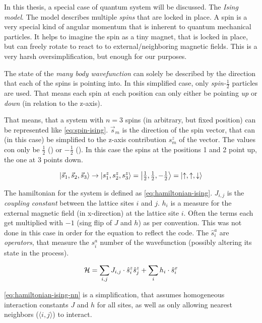 In this thesis, a special case of quantum system will be discussed. 
The \emph{Ising model}.
The model describes multiple \emph{spins} that are locked in place. 
A spin is a very special kind of angular momentum that is inherent to quantum mechanical particles.
It helps to imagine the spin as a tiny magnet, that is locked in place, but can freely rotate to react to to external/neighboring  magnetic fields. This is a very harsh oversimplification, but enough for our purposes.

The state of the \emph{many body wavefunction} can solely be described by the direction that each of the spins is pointing into. In this simplified case, only \emph{spin-$\frac{1}{2}$} particles are used. That means each spin at each position can only either be pointing \emph{up} \up or \emph{down} \down (in relation to the z-axis).

That means, that a system with $n=3$ spins (in arbitrary, but fixed position) can be represented like \ref{eq:spin-ising}. $\vec{s}_m$ is the direction of the spin vector, that can (in this case) be simplified to the z-axis contribution $s^z_m$ of the vector. The values con only be $\frac{1}{2}$ (\up) or $-\frac{1}{2}$ (\down).
In this case the spins at the positions 1 and 2 point up, the one at 3 points down.

\begin{equation}
    \label{eq:spin-ising}
    \ket{\vec{s}_1, \vec{s}_2, \vec{s}_3} \rightarrow \ket{s^z_{1}, s^z_{2}, s^z_{3}} = \ket{\tfrac{1}{2}, \tfrac{1}{2}, -\tfrac{1}{2}} = \ket{\uparrow, \uparrow, \downarrow}
\end{equation}

The hamiltonian for the system is defined as \ref{eq:hamiltonian-ising}. $J_{i, j}$ is the \emph{coupling constant} between the lattice sites $i$ and $j$. $h_i$ is a measure for the external magnetic field (in x-direction) at the lattice site $i$. Often the terms each get multiplied with $-1$ (sing flip of $J$ and $h$) as per convention. This was not done in this case in order for the equation to reflect the code. The $\hat{s}^a_i$ are \emph{operators}, that measure the $s^a_i$ number of the wavefunction (possibly altering its state in the process).

\begin{equation}
    \label{eq:hamiltonian-ising}
    \mathcal{H} = \sum\limits_{i, j} J_{i, j} \cdot \hat{s}^z_i \hat{s}^z_j + \sum\limits_{i} h_i \cdot \hat{s}^x_i
\end{equation}

\ref{eq:hamiltonian-ising-nn} is a simplification, that assumes homogeneous interaction constants $J$ and $h$ for all sites, as well as only allowing nearest neighbors ($\langle i, j\rangle$) to interact.

